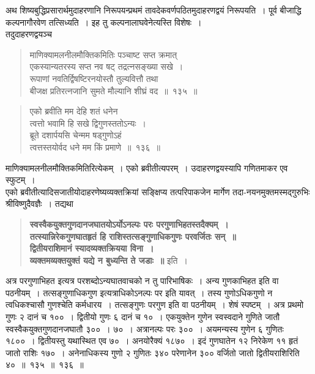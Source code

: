 \documentclass[11pt, openany]{book}
\begin{document}
\vspace{-4mm}
 अथ शिष्यबुद्धिप्रसारार्थमुदाहरणानि निरूपयन्प्रथमं
तावदेकवर्णपठितमुदाहरणद्वयं निरूपयति~। पूर्व बीजाद्धि कल्पनागौरवेण तत्सिध्यति~। इह तु कल्पनालाघवेनेत्यस्ति विशेषः~। \\

\vspace{-2mm}
  तदुदाहरणद्वयञ्च\textendash
\begin{quote}
    \eg 
     माणिक्यामलनीलमौक्तिकमितिः पञ्चाष्ट सप्त क्रमात् \\
 एकस्यान्यतरस्य सप्त नव षट् तद्रत्नसङ्ख्या सखे~। \\
 रूपाणां नवतिर्द्विषष्टिरनयोस्तौ तुल्यवित्तौ तथा \\
 बीजक्ष प्रतिरत्नजानि सुमते मौल्यानि शीघ्रं वद~॥~१३५~॥
\end{quote}

 \newpage%
\begin{quote}
    \eg 
     एको ब्रवीति मम देहि शतं धनेन \\
 त्वत्तो भवामि हि सखे द्विगुणस्ततोऽन्यः~। \\
 ब्रूते दशार्पयसि चेन्मम षड्गुणोऽहं \\
 त्वत्तस्तयोर्वद धने मम किं प्रमाणे~॥~१३६~॥~
\end{quote}

 माणिक्यामलनीलमौक्तिकमितिरित्येकम्~। एको ब्रवीतीत्यपरम्~। उदाहरणद्वयस्यापि गणितमाकर एव स्फुटम्~। \\

\vspace{-4mm}
 एको ब्रवीतीत्यादिसजातीयोदाहरणेष्यव्यक्तक्रियां सङ्क्षिप्य तत्परिपाकजेन
मार्गेण तदा-नयनमुक्तमस्मद्गुरुभिः श्रीविष्णुदैवज्ञैः~। तद्यथा\textendash

\begin{quote}
{\qt \textbf{स्वस्वैकयुक्तगुणदानजघातयोऽर्योऽनल्पः परः परगुणाभिहतस्तदैक्यम्~। \\
तत्स्यान्निरेकगुणघातहृतं हि राशिस्तत्सङ्गुणाधिकगुणः परवर्जितः सन्~॥\\
द्वितीयराशिमानं स्यादव्यक्तक्रियया विना~। \\
 व्यक्तमव्यक्तयुक्तं यद्ये न बुध्यन्ति ते जडाः~॥}} इति~।
\end{quote}
 
 अत्र परगुणाभिहत इत्यत्र परशब्दोऽन्यघातवाचको न तु पारिभाषिकः~। 
अन्य गुणकाभिहत इति वा पठनीयम्~। तत्सङ्गुणाधिकगुण इत्यत्राधिकोऽनल्पः पर 
इति यावत्~। तस्य गुणोऽधिकगुणो न त्वधिकश्चासौ गुणश्चेति कर्मधारय~।
तत्सङ्गुणः 
परगुण इति वा पठनीयम्~। शेषं स्पष्टम्~। अत्र प्रथमो गुणः २ दानं च १००~।
द्वितीयो गुणः ६ दानं च १०~। एकयुक्तेन गुणेन स्वस्वदाने गुणिते जातौ
स्वस्वैकयुक्तगुणदानजघातौ ३००~। ७०~। अत्रानल्पः परः ३००~। अयमन्यस्य गुणेन ६ गुणितः
१८००~। द्वितीयस्तु यथास्थित एव ७०~। अनयोरैक्यं १८७०~। इदं गुणघातेन 
१२ निरेकेण ११ हृतं जातो राशिः १७०~। अनेनाधिकस्य गुणो २ गुणितः ३४० 
परेणानेन ३०० वर्जितो जातो द्वितीयराशिरिति ४०~॥~१३५~॥~१३६~॥ \\
\end{document}
